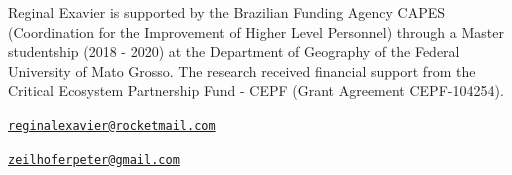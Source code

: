 Reginal Exavier is supported by the Brazilian Funding Agency CAPES
(Coordination for the Improvement of Higher Level Personnel) through a
Master studentship (2018 - 2020) at the Department of Geography of the
Federal University of Mato Grosso. The research received financial support from the Critical Ecosystem Partnership Fund - CEPF (Grant Agreement CEPF-104254).




\address{%
Reginal Exavier\\
Department of Geography\\
Federal University of Mato Grosso\\ Avenida Fernando Corrêa da Costa, 2367 -- Boa Esperança, Cuiabá -- MT,
78060-900\\
ORCiD: 0000-0002-5237-523X\\
}
\href{mailto:reginalexavier@rocketmail.com}{\nolinkurl{reginalexavier@rocketmail.com}}

\address{%
Peter Zeilhofer\\
Department of Geography\\
Federal University of Mato Grosso\\ Avenida Fernando Corrêa da Costa, 2367 -- Boa Esperança, Cuiabá -- MT,
78060-900\\
}
\href{mailto:zeilhoferpeter@gmail.com}{\nolinkurl{zeilhoferpeter@gmail.com}}


